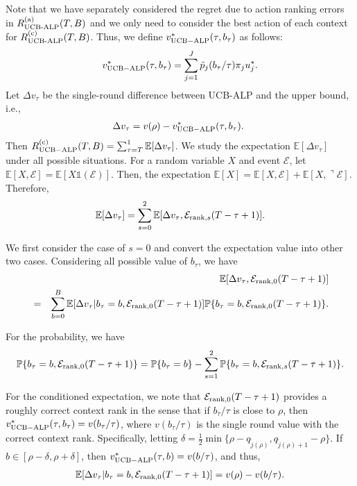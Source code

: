 Note that we have separately considered the regret due to action ranking errors in  $R_{\text{UCB-ALP}}^{\rm (a)}(T, B)$ and we only need to consider the best action of each context for $R_{\text{UCB-ALP}}^{\rm (c)}(T, B)$. Thus, we define $v^*_{\rm UCB-ALP}(\tau, b_{\tau})$ as follows:
\begin{equation}
v^*_{\rm UCB-ALP}(\tau, b_{\tau})= \sum_{j = 1}^J \tilde{p}_j(b_{\tau}/\tau) \pi_j u_j^*.\nonumber
\end{equation}
Let $\Delta v_\tau$ be the single-round difference between  UCB-ALP and the upper bound, i.e.,
\begin{eqnarray}
\Delta v_\tau = v(\rho) -v^*_{\rm UCB-ALP}(\tau, b_{\tau}).\nonumber \
\end{eqnarray}
Then $R_{\rm {UCB-ALP}}^{({\rm c})}(T, B) = \sum_{\tau = T}^1 \mathbb{E}[\Delta v_\tau]$. We study the expectation $\mathbb{E}[\Delta v_{\tau}]$ under all possible situations. For a random variable $X$ and event $\mathcal{E}$, let $\mathbb{E}[X,\mathcal{E}] = \mathbb{E}[X\mathds{1}(\mathcal{E})]$. Then, the expectation $\mathbb{E}[X] = \mathbb{E}[X,\mathcal{E}] + \mathbb{E}[X,\urcorner\mathcal{E}]$. Therefore,
\begin{eqnarray} \label{eq:correct_rank_single_round_regret}
\mathbb{E}[\Delta v_\tau]  =  \sum_{s = 0}^2\mathbb{E}[\Delta {v}_{\tau},  \mathcal{E}_{{\rm rank}, s}(T - \tau + 1)].
\end{eqnarray}

We first consider the case of $s = 0$ and convert the expectation value into other two cases. Considering all possible value of $b_\tau$, we have
\begin{eqnarray} \label{eq:diff_case0}
&& \mathbb{E}[\Delta {v}_{\tau},  \mathcal{E}_{{\rm rank}, 0}(T - \tau + 1)]\nonumber \\
& = & \sum_{b = 0}^{B} \mathbb{E}[\Delta {v}_{\tau}| b_{\tau} = b,  \mathcal{E}_{{\rm rank}, 0}(T - \tau + 1)] \mathbb{P}\{b_{\tau} = b,  \mathcal{E}_{{\rm rank}, 0}(T - \tau + 1)\}.
\end{eqnarray}

For the probability, we have
\begin{align}\label{eq:diff_case0_prob}
\mathbb{P}\{b_{\tau} = b, \mathcal{E}_{{\rm rank}, 0}(T - \tau + 1)\}
= \mathbb{P}\{b_{\tau} = b\} - \sum_{s= 1}^2 \mathbb{P}\{b_{\tau} = b, \mathcal{E}_{{\rm rank}, s}(T - \tau + 1)\}.
\end{align}

For the conditioned expectation, we note that  $\mathcal{E}_{{\rm rank}, 0}(T - \tau + 1)$ provides a roughly correct context rank in the sense that if $b_{\tau}/\tau$ is close to $\rho$, then $v^*_{\rm UCB-ALP}(\tau, b_{\tau}) = v(b_\tau/\tau)$, where $v(b_\tau/\tau)$ is the single round value with the correct context rank.
Specifically, letting $\delta = \frac{1}{2}\min\{\rho - q_{\tilde{j}(\rho)},q_{\tilde{j}(\rho)+1}- \rho\}$.
If $b \in [\rho - \delta, \rho + \delta]$, then $v^*_{\rm UCB-ALP}(\tau, b) = v(b/\tau)$, and thus,
\begin{eqnarray} \label{eq:diff_case0_exp}
\mathbb{E}[\Delta {v}_{\tau}| b_{\tau} = b,  \mathcal{E}_{{\rm rank}, 0}(T - \tau + 1)] =  v(\rho) - v(b/\tau).
\end{eqnarray}

